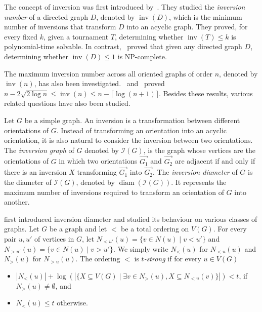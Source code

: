 \documentclass[
final
]{dmtcs-episciences}
\DeclareMathOperator{\diam}{\mathrm{diam}}
\DeclareMathOperator{\inv}{\mathrm{inv}}
\begin{document}
The concept of inversion was first introduced by~\cite{belkhechine2010inversion}. They studied the \emph{inversion number} of a directed graph $D$, denoted by $\inv(D)$, which is the minimum number of inversions that transform $D$ into an acyclic graph. They proved, for every fixed $k$, given a tournament $T$, determining whether $\inv(T) \le k$ is polynomial-time solvable.
In contrast,~\cite{bang2022inversion} proved that given any directed graph $D$, determining whether $\inv(D) \le 1$ is NP-complete. 

The maximum inversion number across all oriented graphs of order $n$, denoted by $\inv(n)$, has also been investigated.~\cite{aubian2025problems} and~\cite{alon2024invertibility} proved $n-2\sqrt{2\log n} \le \inv(n) \le n - \lceil \log (n+1) \rceil$. Besides these results, various related questions have also been studied.

Let $G$ be a simple graph. An inversion is a transformation between different orientations of $G$. Instead of transforming an orientation into an acyclic orientation, it is also natural to consider the inversion between two orientations. The \emph{inversion graph} of $G$ denoted by $\mathcal{I}(G)$, is the graph whose vertices are the orientations of $G$ in which two orientations $\overrightarrow{G_1}$ and $\overrightarrow{G_2}$ are adjacent if and only if there is an inversion $X$ transforming $\overrightarrow{G_1}$ into $\overrightarrow{G_2}$. The \emph{inversion diameter} of $G$ is the diameter of $\mathcal{I}(G)$, denoted by $\diam(\mathcal{I}(G))$. It represents the maximum number of inversions required to transform an orientation of $G$ into another.

\cite{havet2024diameter} first introduced inversion diameter and studied its behaviour on various classes of graphs.
Let $G$ be a graph and let $<$ be a total ordering on $V(G)$. For every pair $u, u'$ of vertices in $G$, let $N_{<u'}(u) = \{ v\in N(u) \mid v<u' \}$ and $N_{>u'}(u) = \{ v \in N(u) \mid v>u' \}$. We simply write $N_<(u)$ for $N_{<u}(u)$ and $N_>(u)$ for $N_{>u}(u)$.
The ordering $<$ is \emph{$t$-strong} if for every $u \in V(G)$
\begin{itemize}
    \item $|N_<(u)| + \log( |\{X \subseteq V(G) \mid \exists v \in N_>(u) , X \subseteq N_{<u}(v) \}| ) < t$, if $N_>(u) \neq \emptyset$, and
    \item $N_{<}(u) \le t $ otherwise.
\end{itemize}
\end{document}
